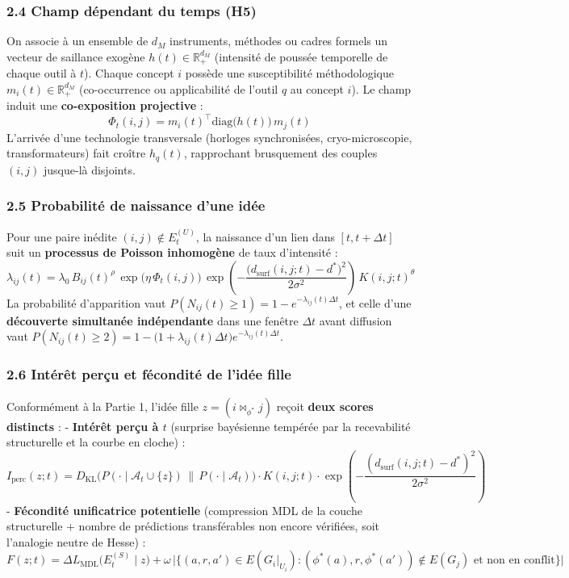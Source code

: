 \documentclass[a4paper,11pt]{article}
\begin{document}
\subsubsection*{2.4 Champ dépendant du temps (H5)}

On associe à un ensemble de \(d_M\) instruments, méthodes ou cadres
formels un vecteur de saillance exogène \(h(t) \in \mathbb{R}_+^{d_M}\)
(intensité de poussée temporelle de chaque outil à \(t\)). Chaque
concept \(i\) possède une susceptibilité méthodologique
\(m_i(t) \in \mathbb{R}_+^{d_M}\) (co-occurrence ou applicabilité de
l'outil \(q\) au concept \(i\)). Le champ induit une
\textbf{co-exposition projective} :
\[\Phi_t(i,j) = m_i(t)^\top \mathrm{diag}\!\big(h(t)\big)\, m_j(t)\]
L'arrivée d'une technologie transversale (horloges synchronisées,
cryo-microscopie, transformateurs) fait croître \(h_q(t)\), rapprochant
brusquement des couples \((i,j)\) jusque-là disjoints.

\subsubsection*{2.5 Probabilité de naissance d'une idée}

Pour une paire inédite \((i,j) \notin E_t^{(U)}\), la naissance d'un
lien dans \([t, t+\Delta t]\) suit un \textbf{processus de Poisson
inhomogène} de taux d'intensité :
\[\lambda_{ij}(t) = \lambda_0 \, B_{ij}(t)^{\rho} \, \exp\!\big(\eta\,\Phi_t(i,j)\big) \, \exp\!\left(-\frac{\big(d_{\mathrm{surf}}(i,j;t) - d^*\big)^2}{2\sigma^2}\right) \, K(i,j;t)^{\theta}\]
La probabilité d'apparition vaut
\(P(N_{ij}(t) \ge 1) = 1 - e^{-\lambda_{ij}(t)\Delta t}\), et celle
d'une \textbf{découverte simultanée indépendante} dans une fenêtre
\(\Delta t\) avant diffusion vaut
\(P(N_{ij}(t) \ge 2) = 1 - \big(1 + \lambda_{ij}(t)\Delta t\big)e^{-\lambda_{ij}(t)\Delta t}\).

\subsubsection*{2.6 Intérêt perçu et fécondité de l'idée fille}

Conformément à la Partie 1, l'idée fille \(z = (i \bowtie_{\phi^*} j)\)
reçoit \textbf{deux scores distincts} : - \textbf{Intérêt perçu à \(t\)}
(surprise bayésienne tempérée par la recevabilité structurelle et la
courbe en cloche) :
\[I_{\mathrm{perc}}(z;t) = D_{\mathrm{KL}}\!\big(P(\cdot \mid \mathcal{A}_t \cup \{z\}) \,\|\, P(\cdot \mid \mathcal{A}_t)\big) \cdot K(i,j;t) \cdot \exp\!\left(-\frac{(d_{\mathrm{surf}}(i,j;t) - d^*)^2}{2\sigma^2}\right)\]
- \textbf{Fécondité unificatrice potentielle} (compression MDL de la
couche structurelle + nombre de prédictions transférables non encore
vérifiées, soit l'analogie neutre de Hesse) :
\[F(z;t) = \Delta L_{\mathrm{MDL}}\!\big(E_t^{(S)} \mid z\big) + \omega\,\Big|\big\{(a,r,a') \in E(G_i|_{U_i}) : (\phi^*(a), r, \phi^*(a')) \notin E(G_j) \text{ et non en conflit}\big\}\Big|\]
\end{document}
